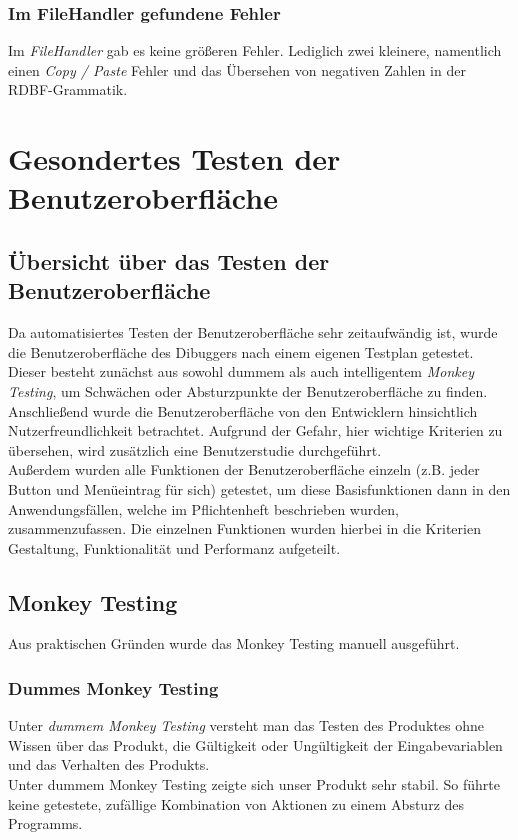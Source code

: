 \documentclass[parskip=full]{scrartcl}
\begin{document}
\subsubsection{Im FileHandler gefundene Fehler}
Im \textit{FileHandler} gab es keine größeren Fehler. Lediglich zwei kleinere, namentlich einen \textit{Copy / Paste} Fehler und das Übersehen von negativen Zahlen in der RDBF-Grammatik.

\newpage
\section{Gesondertes Testen der Benutzeroberfläche}\label{gui}

\subsection{Übersicht über das Testen der Benutzeroberfläche}
Da automatisiertes Testen der Benutzeroberfläche sehr zeitaufwändig ist, wurde die Benutzeroberfläche des Dibuggers nach einem eigenen Testplan getestet. Dieser besteht zunächst aus sowohl dummem als auch intelligentem \textit{Monkey Testing}, um Schwächen oder Absturzpunkte der Benutzeroberfläche zu finden. \\
Anschließend wurde die Benutzeroberfläche von den Entwicklern hinsichtlich Nutzerfreundlichkeit betrachtet. Aufgrund der Gefahr, hier wichtige Kriterien zu übersehen, wird zusätzlich eine Benutzerstudie durchgeführt. \\
Außerdem wurden alle Funktionen der Benutzeroberfläche einzeln (z.B. jeder Button und Menüeintrag für sich) getestet, um diese Basisfunktionen dann in den Anwendungsfällen, welche im Pflichtenheft beschrieben wurden, zusammenzufassen. Die einzelnen Funktionen wurden hierbei in die Kriterien Gestaltung, Funktionalität und Performanz aufgeteilt.


\subsection{Monkey Testing}
Aus praktischen Gründen wurde das Monkey Testing manuell ausgeführt.
\subsubsection{Dummes Monkey Testing}
Unter \textit{dummem Monkey Testing} versteht man das Testen des Produktes ohne Wissen über das Produkt, die Gültigkeit oder Ungültigkeit der Eingabevariablen und  das Verhalten des Produkts. \\
Unter dummem Monkey Testing zeigte sich unser Produkt sehr stabil. So führte keine getestete, zufällige Kombination von Aktionen zu einem Absturz des Programms. 
\end{document}
